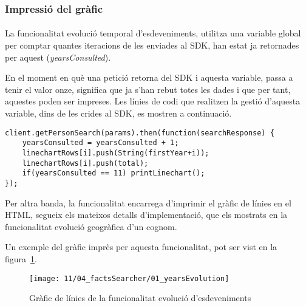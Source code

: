 \subsubsection{Impressió del gràfic}

\paragraph{}
La funcionalitat evolució temporal d'esdeveniments, utilitza una variable global per comptar quantes iteracions de les enviades al SDK, han estat ja retornades per aquest (\emph{yearsConsulted}).

En el moment en què una petició retorna del SDK i aquesta variable, passa a tenir el valor onze, significa que ja s'han rebut totes les dades i que per tant, aquestes poden ser impreses. Les línies de codi que realitzen la gestió d'aquesta variable, dins de les crides al SDK, es mostren a continuació.

\begin{lstlisting}[style=rawOwn,caption={Gestió de la variable \emph{yearsConsulted}, per controlar el final de la cerca}]
client.getPersonSearch(params).then(function(searchResponse) {
    yearsConsulted = yearsConsulted + 1;
    linechartRows[i].push(String(firstYear+i));
    linechartRows[i].push(total);
    if(yearsConsulted == 11) printLinechart();
});
\end{lstlisting}

Per altra banda, la funcionalitat encarrega d’imprimir el gràfic de línies en el HTML, segueix els mateixos detalls d’implementació, que els mostrats en la funcionalitat evolució geogràfica d’un cognom.

Un exemple del gràfic imprès per aquesta funcionalitat, pot ser vist en la figura~\ref{fig:factsLine}.

\begin{figure}[h]
    \texttt{[image: 11/04\_factsSearcher/01\_yearsEvolution]}
    \centering
    \caption{Gràfic de línies de la funcionalitat evolució d'esdeveniments}\label{fig:factsLine}
\end{figure}
